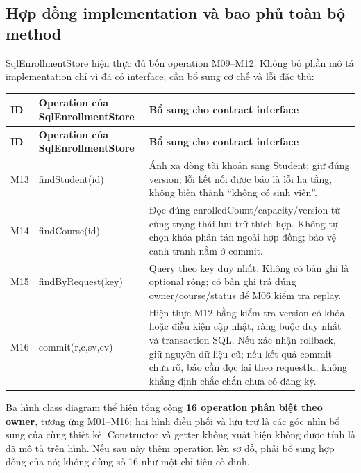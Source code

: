 \subsection{Hợp đồng implementation và bao phủ toàn bộ method}
SqlEnrollmentStore hiện thực đủ bốn operation M09--M12. Không bỏ phần mô tả implementation chỉ vì đã có interface; cần bổ sung cơ chế và lỗi đặc thù:
\begin{longtable}{|L{15mm}|L{43mm}|L{82mm}|}\hline
\textbf{ID} & \textbf{Operation của SqlEnrollmentStore} & \textbf{Bổ sung cho contract interface}\\\hline
\endfirsthead
\hline
\textbf{ID} & \textbf{Operation của SqlEnrollmentStore} & \textbf{Bổ sung cho contract interface}\\\hline
\endhead
M13 & findStudent(id) & Ánh xạ dòng tài khoản sang Student; giữ đúng version; lỗi kết nối được báo là lỗi hạ tầng, không biến thành ``không có sinh viên''.\\\hline
M14 & findCourse(id) & Đọc đúng enrolledCount/capacity/version từ cùng trạng thái lưu trữ thích hợp. Không tự chọn khóa phân tán ngoài hợp đồng; bảo vệ cạnh tranh nằm ở commit.\\\hline
M15 & findByRequest(key) & Query theo key duy nhất. Không có bản ghi là optional rỗng; có bản ghi trả đúng owner/course/status để M06 kiểm tra replay.\\\hline
M16 & commit(r,c,sv,cv) & Hiện thực M12 bằng kiểm tra version có khóa hoặc điều kiện cập nhật, ràng buộc duy nhất và transaction SQL. Nếu xác nhận rollback, giữ nguyên dữ liệu cũ; nếu kết quả commit chưa rõ, báo cần đọc lại theo requestId, không khẳng định chắc chắn chưa có đăng ký.\\\hline
\end{longtable}

Ba hình class diagram thể hiện tổng cộng \textbf{16 operation phân biệt theo owner}, tương ứng M01--M16; hai hình điều phối và lưu trữ là các góc nhìn bổ sung của cùng thiết kế. Constructor và getter không xuất hiện không được tính là đã mô tả trên hình. Nếu sau này thêm operation lên sơ đồ, phải bổ sung hợp đồng của nó; không dùng số 16 như một chỉ tiêu cố định.

